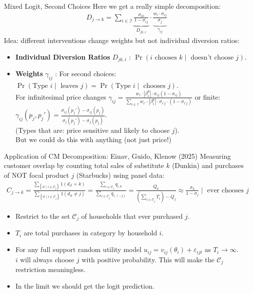 \documentclass[aspectratio=169,10pt]{beamer}
\begin{document}
\begin{frame}{Mixed Logit, Second Choices}
Here we get a really simple decomposition:
\begin{align*}
D_{j \rightarrow k} = \sum_{i \in \mathcal{I}} \underbrace{\frac{\sigma_{ik}}{1-\sigma_{ij}}}_{D_{jk,i}} \cdot \underbrace{\frac{w_i \cdot \sigma_{ij}}{\sigma_{j}}}_{\gamma_{ij}}
\end{align*}
Idea: different interventions change \alert{weights} but not \alert{individual diversion ratios}:
\begin{itemize}
\item \textbf{Individual Diversion Ratios} $D_{jk,i}$ : $\Pr( i \text{ chooses } k \mid \text{ doesn't choose } j)$.

\item \textbf{Weights} $\gamma_{ij}$ : For second choices: $\Pr(\text{Type } i \mid \text{ leaves } j) =\Pr(\text{Type } i \mid \text{ chooses } j)$.\\ For infinitesimal price changes $\gamma_{ij}=\frac{w_i \cdot |\beta_i^p| \cdot \sigma_{ij}(1-\sigma_{ij})}{\sum_{i
 \in \mathcal{I}} w_{i'} \cdot |\beta_i^p| \cdot \sigma_{i'j}\cdot(1-\sigma_{i'j})}$ or finite: $\gamma_{ij}(p_j,p_j')=\frac{\sigma_{ij}(p_j')-\sigma_{ij}(p_j)}{\sigma_{j}(p_j')-\sigma_{j}(p_j)}$.\\
 (Types that are: price sensitive and likely to choose $j$).\\
 But we could do this with anything (not just price!)
\end{itemize}
\end{frame}


\begin{frame}{Application of CM Decomposition: Einav, Guido, Klenow (2025)}
Measuring \alert{customer overlap} by counting total sales of substitute $k$ (Dunkin) and purchases of NOT focal product $j$ (Starbucks) using \alert{panel data}:
\begin{align*}
C_{j \rightarrow k}= 
\frac{\sum_{\left\{i t \mid i \in \mathcal{C}_j\right\}} 1\left(d_{i t}=k\right)}{\sum_{\left\{i t \mid i \in \mathcal{C}_j\right\}} 1\left(d_{i t} \neq j\right)} 
=\frac{\sum_{i \in \mathcal{C}_j} q_{i,k}}{\sum_{i \in \mathcal{C}_j} q_{i,(-j)}} 
= \frac{Q_k}{\left(\sum_{i \in \mathcal{C}_j} T_i \right)
 -Q_j} \approx \frac{\sigma_k}{1-\sigma_j} \mid \text{ ever chooses } j
\end{align*}
\begin{itemize}
	\item Restrict to the set $\mathcal{C}_j$ of households that \alert{ever purchased} $j$.
	\item $T_i$ are total purchases in category by household $i$.
    \item For any full support random utility model $u_{ij} = v_{ij}(\theta_i) + \varepsilon_{ijt}$ as $T_i \rightarrow \infty$.\\
     $i$ will always choose $j$ with positive probability. This will make the $\mathcal{C}_j$ restriction meaningless.
    \item In the limit we should get the logit prediction.
\end{itemize}
\end{frame}
\end{document}

